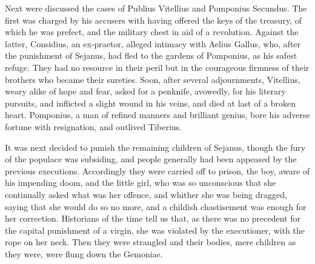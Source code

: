 Next were discussed the cases of Publius Vitellius and Pomponius Secundus. The first was charged by his accusers with having offered the keys of the treasury, of which he was prefect, and the military chest in aid of a revolution. Against the latter, Considius, an ex-praetor, alleged intimacy with Aelius Gallus, who, after the punishment of Sejanus, had fled to the gardens of Pomponius, as his safest refuge. They had no resource in their peril but in the courageous firmness of their brothers who became their sureties. Soon, after several adjournments, Vitellius, weary alike of hope and fear, asked for a penknife, avowedly, for his literary pursuits, and inflicted a slight wound in his veins, and died at last of a broken heart. Pomponius, a man of refined manners and brilliant genius, bore his adverse fortune with resignation, and outlived Tiberius.


It was next decided to punish the remaining children of Sejanus, though the fury of the populace was subsiding, and people generally had been appeased by the previous executions. Accordingly they were carried off to prison, the boy, aware of his impending doom, and the little girl, who was so unconscious that she continually asked what was her offence, and whither she was being dragged, saying that she would do so no more, and a childish chastisement was enough for her correction. Historians of the time tell us that, as there was no precedent for the capital punishment of a virgin, she was violated by the executioner, with the rope on her neck. Then they were strangled and their bodies, mere children as they were, were flung down the Gemoniae.


